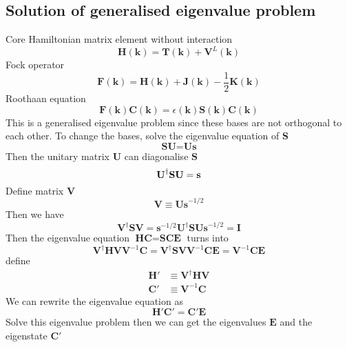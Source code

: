 \documentclass{article}
\begin{document}
    \subsection{Solution of generalised eigenvalue problem}
        Core Hamiltonian matrix element without interaction
        \begin{equation}
            \textbf{H}(\textbf{k}) = \textbf{T}(\textbf{k}) + \textbf{V}^L(\textbf{k})
        \end{equation}
        Fock operator
        \begin{equation}
            \textbf{F}(\textbf{k}) = \textbf{H}(\textbf{k})+\textbf{J}(\textbf{k})-\frac{1}{2}\textbf{K}(\textbf{k})
        \end{equation}
        Roothaan equation
        \begin{equation}
            \textbf{F}(\textbf{k})\textbf{C}(\textbf{k}) = \epsilon(\textbf{k})\textbf{S}(\textbf{k})\textbf{C}(\textbf{k})
        \end{equation}
        This is a generalised eigenvalue problem since these bases are not orthogonal to each other. 
        To change the bases, solve the eigenvalue equation of $\textbf{S}$
        $$ \textbf{SU} = \textbf{Us} $$
        Then the unitary matrix $\textbf{U}$ can diagonalise $\textbf{S}$
        $$ \textbf{U}^\dagger\textbf{SU} = \textbf{\textbf{s}} $$
        Define matrix $\textbf{V}$
        \begin{equation}
            \textbf{V} \equiv \textbf{Us}^{-1/2}
        \end{equation}
        Then we have
        $$ \textbf{V}^\dagger\textbf{SV} = \textbf{s}^{-1/2}\textbf{U}^\dagger\textbf{SUs}^{-1/2} = \textbf{I} $$
        Then the eigenvalue equation $\textbf{HC} = \textbf{SCE}$ turns into
        $$ \textbf{V}^\dagger\textbf{HVV}^{-1}\textbf{C} =  \textbf{V}^\dagger\textbf{SVV}^{-1}\textbf{C}\textbf{E} = \textbf{V}^{-1}\textbf{C}\textbf{E} $$
        define
        \begin{align}
            \textbf{H}' &\equiv \textbf{V}^\dagger\textbf{HV}\\
            \textbf{C}' &\equiv \textbf{V}^{-1}\textbf{C}
        \end{align}
        We can rewrite the eigenvalue equation as
        \begin{equation}
            \textbf{H}'\textbf{C}' = \textbf{C}'\textbf{E}
        \end{equation}
        Solve this eigenvalue problem then we can get the eigenvalues $\textbf{E}$ and the eigenstate $\textbf{C}'$
\end{document}
